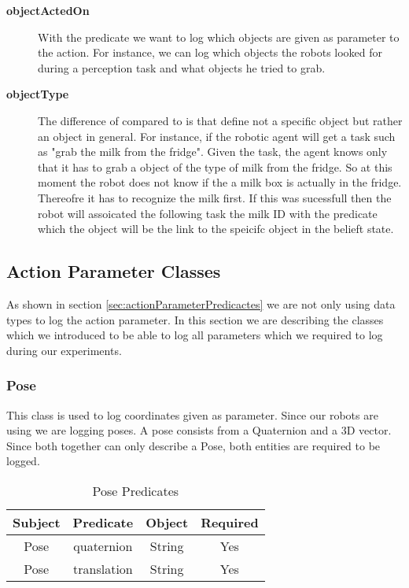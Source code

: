 \begin{description}
	\item[\textbf{objectActedOn}]
		With the predicate  we want to log which objects are given as parameter to the action.
		For instance, we can log which objects the robots looked for during a perception task and what objects he tried to grab.
	\item[\textbf{objectType}]
		The difference of  compared to  is that  define not a specific object but rather an object in general.
		For instance, if the robotic agent will get a task such as "grab the milk from the fridge".
		Given the task, the agent knows only that it has to grab a object of the type of milk from the fridge.
		So at this moment the robot does not know if the a milk box is actually in the fridge.
		Thereofre it has to recognize the milk first.
		If this was sucessfull then the robot will assoicated the following task the milk ID with the predicate  which the object will be the link to the speicifc object in the belieft state.
\end{description}

\subsection{Action Parameter Classes}
As shown in section \ref{sec:actionParameterPredicactes} we are not only using data types to log the action parameter.
In this section we are describing the \owl classes which we introduced to be able to log all parameters which we required to log during our experiments.

\subsubsection{Pose}
	\label{sec:pose}
	This class is used to log coordinates given as parameter.
	Since our robots are using \ros we are logging poses.
	A pose consists from a Quaternion and a 3D vector.
	Since both together can only describe a Pose, both entities are required to be logged.
	\begin{table}[H]
		\begin{tabular}{| c | c | c | c |}
			\hline			
			\textbf{Subject} & \textbf{Predicate} & \textbf{Object} & \textbf{Required}\\
			\hline
			Pose & quaternion & String & Yes \\
			\hline
			Pose & translation & String & Yes \\			
			\hline
		\end{tabular}
		\caption{Pose Predicates}
		\label{table:pose_predicates}
	\end{table}
	
